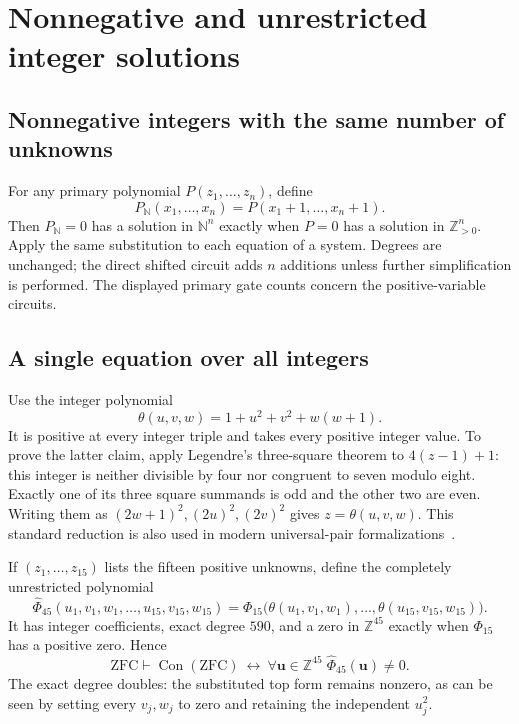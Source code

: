 \documentclass[11pt]{article}
\newcommand{\NN}{\mathbb N}
\newcommand{\ZZ}{\mathbb Z}
\newcommand{\Pos}{\mathbb Z_{>0}}
\newcommand{\Con}{\operatorname{Con}}
\theoremstyle{remark}\newtheorem{remark}[theorem]{Remark}
\begin{document}
\section{Nonnegative and unrestricted integer solutions}\label{sec:domains}

\subsection{Nonnegative integers with the same number of unknowns}

For any primary polynomial $P(z_1,\ldots,z_n)$, define
\[
 P_{\NN}(x_1,\ldots,x_n)=P(x_1+1,\ldots,x_n+1).
\]
Then $P_{\NN}=0$ has a solution in $\NN^n$ exactly when $P=0$ has a solution in $\Pos^n$. Apply the same substitution to each equation of a system. Degrees are unchanged; the direct shifted circuit adds $n$ additions unless further simplification is performed. The displayed primary gate counts concern the positive-variable circuits.

\subsection{A single equation over all integers}

Use the integer polynomial
\[
 \theta(u,v,w)=1+u^2+v^2+w(w+1).
\]
It is positive at every integer triple and takes every positive integer value. To prove the latter claim, apply Legendre's three-square theorem to $4(z-1)+1$: this integer is neither divisible by four nor congruent to seven modulo eight. Exactly one of its three square summands is odd and the other two are even. Writing them as $(2w+1)^2,(2u)^2,(2v)^2$ gives $z=\theta(u,v,w)$. This standard reduction is also used in modern universal-pair formalizations~\cite{BayerDavid2025}.

If $(z_1,\ldots,z_{15})$ lists the fifteen positive unknowns, define the completely unrestricted polynomial
\begin{equation}
 \widehat\Phi_{45}(u_1,v_1,w_1,\ldots,u_{15},v_{15},w_{15})
 =\Phi_{15}\bigl(\theta(u_1,v_1,w_1),\ldots,\theta(u_{15},v_{15},w_{15})\bigr).
\end{equation}
It has integer coefficients, exact degree $590$, and a zero in $\ZZ^{45}$ exactly when $\Phi_{15}$ has a positive zero. Hence
\[
 \mathrm{ZFC}\vdash\Con(\mathrm{ZFC})\ \longleftrightarrow\
 \forall\mathbf u\in\ZZ^{45}\;\widehat\Phi_{45}(\mathbf u)\ne0.
\]
The exact degree doubles: the substituted top form remains nonzero, as can be seen by setting every $v_j,w_j$ to zero and retaining the independent $u_j^2$.
\end{document}
